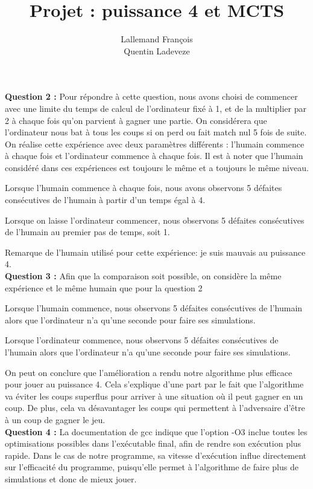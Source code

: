 \documentclass[a4paper, 11pt]{article}
\title{Projet : puissance 4 et MCTS}
\author{Lallemand François\\Quentin Ladeveze}
\begin{document}
\maketitle

\textbf{Question 2 : } Pour répondre à cette question, nous avons choisi de commencer avec une limite du temps de calcul de l'ordinateur fixé à 1, et de la multiplier par 2 à chaque fois qu'on parvient à gagner une partie. On considérera que l'ordinateur nous bat à tous les coups si on perd ou fait match nul 5 fois de suite. On réalise cette expérience avec deux paramètres différents : l'humain commence à chaque fois et l'ordinateur commence à chaque fois. Il est à noter que l'humain considéré dans ces expériences est toujours le même et a toujours le même niveau.

Lorsque l'humain commence à chaque fois, nous avons observons 5 défaites consécutives de l'humain à partir d'un temps égal à 4.

Lorsque on laisse l'ordinateur commencer, nous observons 5 défaites consécutives de l'humain au premier pas de temps, soit 1. 

Remarque de l'humain utilisé pour cette expérience: je suis mauvais au puissance 4.\\

\textbf{Question 3 : } Afin que la comparaison soit possible, on considère la même expérience et le même humain que pour la question 2

Lorsque l'humain commence, nous observons 5 défaites consécutives de l'humain alors que l'ordinateur n'a qu'une seconde pour faire ses simulations.

Lorsque l'ordinateur commence, nous observons 5 défaites consécutives de l'humain alors que l'ordinateur n'a qu'une seconde pour faire ses simulations.

On peut on conclure que l'amélioration a rendu notre algorithme plus efficace pour jouer au puissance 4. Cela s'explique d'une part par le fait que l'algorithme va éviter les coups superflus pour arriver à une situation où il peut gagner en un coup. De plus, cela va désavantager les coups qui permettent à l'adversaire d'être à un coup de gagner le jeu.\\

\textbf{Question 4 : } La documentation de gcc indique que l'option -O3 inclue toutes les optimisations possibles dans l'exécutable final, afin de rendre son exécution plus rapide. Dans le cas de notre programme, sa vitesse d'exécution influe directement sur l'efficacité du programme, puisqu'elle permet à l'algorithme de faire plus de simulations et donc de mieux jouer. 
\end{document}
